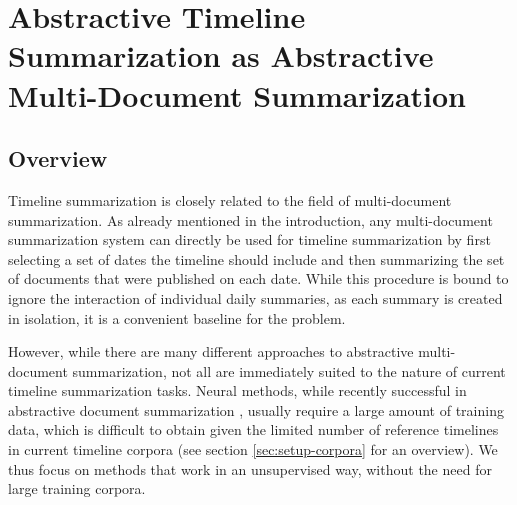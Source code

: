 \documentclass[a4paper,BCOR=10mm]{report}
\numberwithin{lemma}{chapter}
\numberwithin{definition}{chapter}
\begin{document}









\chapter{Abstractive Timeline Summarization as Abstractive Multi-Document Summarization} \label{sec:baseline}

\section{Overview}

Timeline summarization is closely related to the field of multi-document summarization. As already mentioned in the introduction, any multi-document summarization system can directly be used for timeline summarization by first selecting a set of dates the timeline should include and then summarizing the set of documents that were published on each date.
While this procedure is bound to ignore the interaction of individual daily summaries, as each summary is created in isolation, it is a convenient baseline for the problem.

However, while there are many different approaches to abstractive multi-document summarization, not all are immediately suited to the nature of current timeline summarization tasks. Neural methods, while recently successful in abstractive document summarization \citep{paulus}, usually require a large amount of training data, which is difficult to obtain given the limited number of reference timelines in current timeline corpora (see section \ref{sec:setup-corpora} for an overview).
We thus focus on methods that work in an unsupervised way, without the need for large training corpora.
\end{document}
